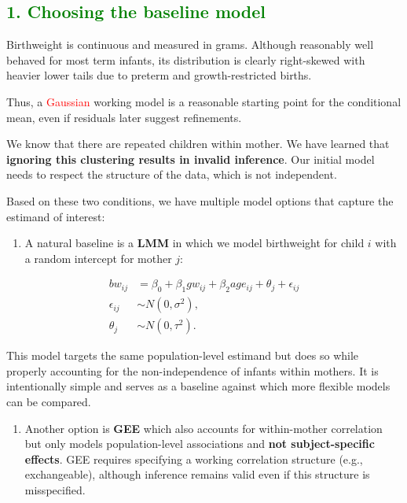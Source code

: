 \documentclass[
  letterpaper,
  DIV=11,
  numbers=noendperiod]{scrreprt}
\providecommand{\tightlist}{%
  \setlength{\itemsep}{0pt}\setlength{\parskip}{0pt}}\usepackage{longtable,booktabs,array}
\begin{document}
\hypertarget{section-59}{%
\subsection*{\texorpdfstring{\textcolor{green}{1. Choosing the baseline model}}{}}\label{section-59}}

Birthweight is continuous and measured in grams. Although reasonably
well behaved for most term infants, its distribution is clearly
right-skewed with heavier lower tails due to preterm and
growth-restricted births.

Thus, a \textcolor{red}{Gaussian} working model is a reasonable starting
point for the conditional mean, even if residuals later suggest
refinements.

We know that there are repeated children within mother. We have learned
that \textbf{ignoring this clustering results in invalid inference}. Our
initial model needs to respect the structure of the data, which is not
independent.

Based on these two conditions, we have multiple model options that
capture the estimand of interest:

\begin{enumerate}
\def\labelenumi{(\arabic{enumi})}
\tightlist
\item
  A natural baseline is a \textbf{LMM} in which we model birthweight for
  child \(i\) with a random intercept for mother \(j\):
\end{enumerate}

\[
\begin{align*}
bw_{ij} &= \beta_0 + \beta_1 gw_{ij} + \beta_2 age_{ij} + \theta_j  + \epsilon_{ij}\\
\epsilon_{ij} &\sim N(0, \sigma^2),\\
\theta_j &\sim N(0, \tau^2).
\end{align*}
\]

This model targets the same population-level estimand but does so while
properly accounting for the non-independence of infants within mothers.
It is intentionally simple and serves as a baseline against which more
flexible models can be compared.

\begin{enumerate}
\def\labelenumi{(\arabic{enumi})}
\setcounter{enumi}{1}
\tightlist
\item
  Another option is \textbf{GEE} which also accounts for within-mother
  correlation but only models population-level associations and
  \textbf{not subject-specific effects}. GEE requires specifying a
  working correlation structure (e.g., exchangeable), although inference
  remains valid even if this structure is misspecified.
\end{enumerate}
\end{document}
